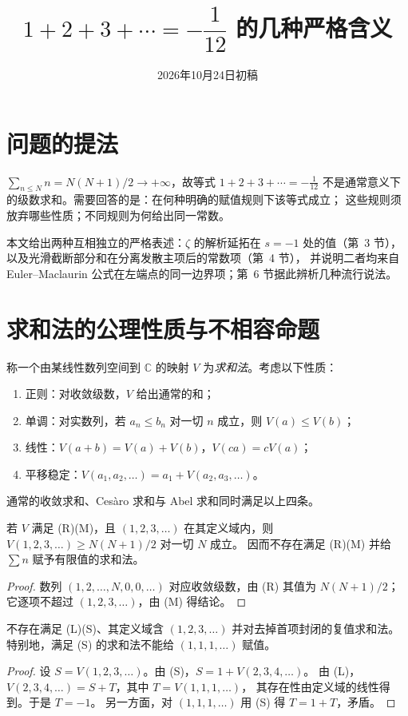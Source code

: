 \documentclass[11pt]{article}
\date{2026年10月24日初稿}
\title{$1+2+3+\cdots=-\dfrac1{12}$ 的几种严格含义}
\begin{document}
\maketitle

\par\medskip

\section{问题的提法}
$\sum_{n\le N}n=N(N+1)/2\to+\infty$，故等式 $1+2+3+\cdots=-\tfrac1{12}$
不是通常意义下的级数求和。需要回答的是：在何种明确的赋值规则下该等式成立；
这些规则须放弃哪些性质；不同规则为何给出同一常数。

本文给出两种互相独立的严格表述：$\zeta$ 的解析延拓在 $s=-1$ 处的值（第~3 节），
以及光滑截断部分和在分离发散主项后的常数项（第~4 节），
并说明二者均来自 Euler--Maclaurin 公式在左端点的同一边界项；第~6 节据此辨析几种流行说法。

\section{求和法的公理性质与不相容命题}
称一个由某线性数列空间到 $\mathbb C$ 的映射 $V$ 为\emph{求和法}。考虑以下性质：
\begin{enumerate}
 \item[(R)] 正则：对收敛级数，$V$ 给出通常的和；
 \item[(M)] 单调：对实数列，若 $a_n\le b_n$ 对一切 $n$ 成立，则 $V(a)\le V(b)$；
 \item[(L)] 线性：$V(a+b)=V(a)+V(b)$，$V(ca)=cV(a)$；
 \item[(S)] 平移稳定：$V(a_1,a_2,\ldots)=a_1+V(a_2,a_3,\ldots)$。
\end{enumerate}
通常的收敛求和、Cesàro 求和与 Abel 求和同时满足以上四条。

\begin{proposition}\label{prop:monotone}
若 $V$ 满足 (R)(M)，且 $(1,2,3,\ldots)$ 在其定义域内，则 $V(1,2,3,\ldots)\ge N(N+1)/2$ 对一切 $N$ 成立。
因而不存在满足 (R)(M) 并给 $\sum n$ 赋予有限值的求和法。
\end{proposition}
\begin{proof}
数列 $(1,2,\ldots,N,0,0,\ldots)$ 对应收敛级数，由 (R) 其值为 $N(N+1)/2$；
它逐项不超过 $(1,2,3,\ldots)$，由 (M) 得结论。
\end{proof}

\begin{proposition}\label{prop:triangle}
不存在满足 (L)(S)、其定义域含 $(1,2,3,\ldots)$ 并对去掉首项封闭的复值求和法。
特别地，满足 (S) 的求和法不能给 $(1,1,1,\ldots)$ 赋值。
\end{proposition}
\begin{proof}
设 $S=V(1,2,3,\ldots)$。由 (S)，$S=1+V(2,3,4,\ldots)$。
由 (L)，$V(2,3,4,\ldots)=S+T$，其中 $T=V(1,1,1,\ldots)$，
其存在性由定义域的线性得到。于是 $T=-1$。
另一方面，对 $(1,1,1,\ldots)$ 用 (S) 得 $T=1+T$，矛盾。
\end{proof}
\end{document}
